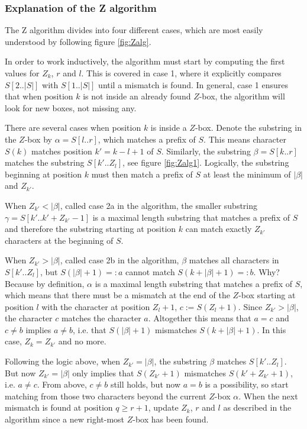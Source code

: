 \subsubsection{Explanation of the Z algorithm}
The Z algorithm divides into four different cases, which are most easily understood by following figure \ref{fig:Zalg}. 

In order to work inductively, the algorithm must start by computing the first values for $Z_k$, $r$ and $l$. This is covered in case 1, where it explicitly compares $S[2..|S|]$ with $S[1..|S|]$ until a mismatch is found. In general, case 1 ensures that when position $k$ is not inside an already found $Z$-box, the algorithm will look for new boxes, not missing any. 

There are several cases when position $k$ is inside a $Z$-box. Denote the substring in the $Z$-box by $\alpha=S[l..r]$, which matches a prefix of $S$. This means character $S(k)$ matches position $k'=k-l+1$ of $S$. Similarly, the substring $\beta=S[k..r]$ matches the substring $S[k'..Z_l]$, see figure \ref{fig:Zalg1}. Logically, the substring beginning at position $k$ must then match a prefix of $S$ at least the minimum of $|\beta|$ and $Z_{k'}$. 

When $Z_{k'}<|\beta|$, called case 2a in the algorithm, the smaller substring $\gamma=S[k'..k'+Z_{k'}-1]$ is a maximal length substring that matches a prefix of $S$ and therefore the substring starting at position $k$ can match exactly $Z_{k'}$ characters at the beginning of $S$. 

When $Z_{k'}>|\beta|$, called case 2b in the algorithm, $\beta$ matches all characters in $S[k'..Z_l]$, but $S(|\beta|+1)=:a$ cannot match $S(k+|\beta|+1)=:b$. Why? Because by definition, $\alpha$ is a maximal length substring that matches a prefix of $S$, which means that there must be a mismatch at the end of the $Z$-box starting at position $l$ with the character at position $Z_l+1$, $c:=S(Z_l+1)$. Since $Z_{k'}>|\beta|$, the character $c$ matches the character $a$. Altogether this means that $a=c$ and $c\neq b$ implies $a\neq b$, i.e. that $S(|\beta|+1)$ mismatches $S(k+|\beta|+1)$. In this case, $Z_k=Z_{k'}$ and no more. 

Following the logic above, when $Z_{k'}=|\beta|$, the substring $\beta$ matches $S[k'..Z_l]$. But now $Z_{k'}=|\beta|$ only implies that $S(Z_{k'}+1)$ mismatches $S(k'+Z_{k'}+1)$, i.e. $a\neq c$. From above, $c\neq b$ still holds, but now $a=b$ is a possibility, so start matching from those two characters beyond the current $Z$-box $\alpha$. When the next mismatch is found at position $q\geq r+1$, update $Z_k$, $r$ and $l$ as described in the algorithm since a new right-most $Z$-box has been found. 

